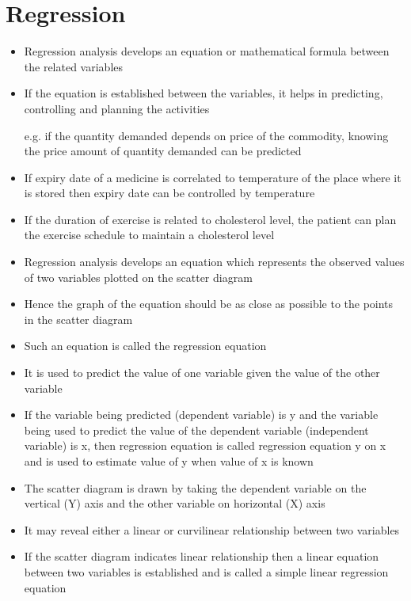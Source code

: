 \documentclass[
10pt, %
a4paper, %
]{report}
\begin{document}
\section*{Regression}
\begin{itemize}
\item Regression analysis develops an equation or mathematical formula between the related variables
\item If the equation is established between the variables, it helps in predicting, controlling and planning the activities
\item[e.g.] if the quantity demanded depends on price of the commodity, knowing the price amount of quantity demanded can be predicted
\item If expiry date of a medicine is correlated to temperature of the place where it is stored then expiry date can be controlled by temperature
\item If the duration of exercise is related to cholesterol level, the patient can plan the exercise schedule to maintain a cholesterol level
\item Regression analysis develops an equation which represents the observed values of two variables plotted on the scatter diagram
\item Hence the graph of the equation should be as close as possible to the points in the scatter diagram
\item Such an equation is called the regression equation
\item It is used to predict the value of one variable given the value of the other variable
\item If the variable being predicted (dependent variable) is y and the variable being used to predict the value of the dependent variable (independent variable) is x, then regression equation is called regression equation y on x and is used to estimate value of y when value of x is known
\item The scatter diagram is drawn by taking the dependent variable on the vertical (Y) axis and the other variable on horizontal (X) axis
\item It may reveal either a linear or curvilinear relationship between two variables
\item If the scatter diagram indicates linear relationship then a linear equation between two variables is established and is called a simple linear regression equation
\end{itemize}
\end{document}
